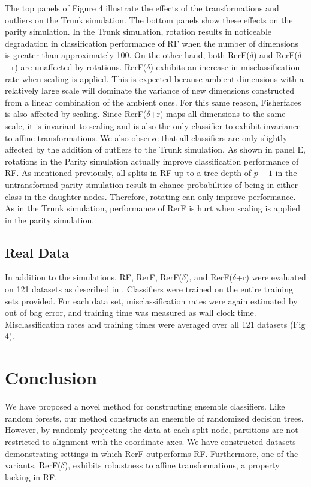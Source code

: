 \documentclass{article} %
\begin{document}
The top panels of Figure 4 illustrate the effects of the transformations and outliers on the Trunk simulation. The bottom panels show these effects on the parity simulation. In the Trunk simulation, rotation results in noticeable degradation in classification performance of RF when the number of dimensions is greater than approximately 100. On the other hand, both RerF($\delta$) and RerF($\delta$+r) are unaffected by rotations. RerF($\delta$) exhibits an increase in misclassification rate when scaling is applied. This is expected because ambient dimensions with a relatively large scale will dominate the variance of new dimensions constructed from a linear combination of the ambient ones. For this same reason, Fisherfaces is also affected by scaling. Since RerF($\delta$+r) maps all dimensions to the same scale, it is invariant to scaling and is also the only classifier to exhibit invariance to affine transformations. We also observe that all classifiers are only slightly affected by the addition of outliers to the Trunk simulation. As shown in panel E, rotations in the Parity simulation actually improve classification performance of RF. As mentioned previously, all splits in RF up to a tree depth of $p - 1$ in the untransformed parity simulation result in chance probabilities of being in either class in the daughter nodes. Therefore, rotating can only improve performance. As in the Trunk simulation, performance of RerF is hurt when scaling is applied in the parity simulation.

\subsection{Real Data}

In addition to the simulations, RF, RerF, RerF($\delta$), and RerF($\delta$+r) were evaluated on 121 datasets as described in \cite{}. Classifiers were trained on the entire training sets provided. For each data set, misclassification rates were again estimated by out of bag error, and training time was measured as wall clock time. Misclassification rates and training times were averaged over all 121 datasets (Fig 4).

\section{Conclusion}

We have proposed a novel method for constructing ensemble classifiers. Like random forests, our method constructs an ensemble of randomized decision trees. However, by randomly projecting the data at each split node, partitions are not restricted to alignment with the coordinate axes. We have constructed datasets demonstrating settings in which RerF outperforms RF. Furthermore, one of the variants, RerF($\delta$), exhibits robustness to affine transformations, a property lacking in RF.
\end{document}
